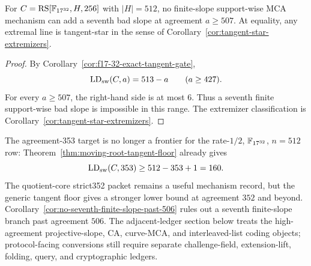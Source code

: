 \begin{corollary}
\label{cor:no-seventh-finite-slope-past-506}
For \(C=\operatorname{RS}[\mathbb F_{17^{32}},H,256]\) with \(|H|=512\), no finite-slope
support-wise MCA mechanism can add a seventh bad slope at agreement
\(a\ge507\).  At equality, any extremal line is tangent-star in the sense of
Corollary~\ref{cor:tangent-star-extremizers}.
\end{corollary}

\begin{proof}
By Corollary~\ref{cor:f17-32-exact-tangent-gate},
\[
  \operatorname{LD}_{\rm sw}(C,a)=513-a
  \qquad (a\ge427).
\]
For every \(a\ge507\), the right-hand side is at most \(6\).  Thus a seventh
finite support-wise bad slope is impossible in this range.  The extremizer
classification is Corollary~\ref{cor:tangent-star-extremizers}.
\end{proof}

\begin{remark}
The agreement-353 target is no longer a frontier for the rate-\(1/2\),
\(\mathbb F_{17^{32}}\), \(n=512\) row: Theorem~\ref{thm:moving-root-tangent-floor}
already gives
\[
  \operatorname{LD}_{\rm sw}(C,353)\ge512-353+1=160.
\]
The quotient-core strict352 packet remains a useful mechanism record, but the
generic tangent floor gives a stronger lower bound at agreement \(352\) and
beyond.  Corollary~\ref{cor:no-seventh-finite-slope-past-506} rules out a
seventh finite-slope branch past agreement \(506\).  The adjacent-ledger
section below treats the high-agreement projective-slope, CA, curve-MCA, and
interleaved-list coding objects; protocol-facing conversions still require
separate challenge-field, extension-lift, folding, query, and cryptographic
ledgers.
\end{remark}
